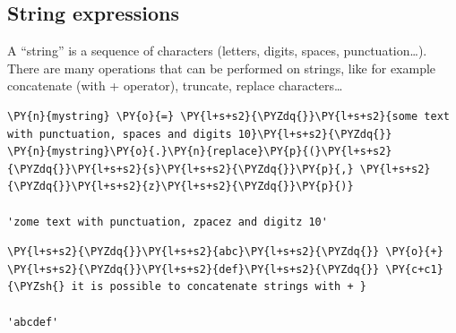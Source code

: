\subsection{String expressions}\label{string-expressions}

A ``string'' is a sequence of characters (letters, digits, spaces, punctuation\ldots{}). There are many operations that can be performed on strings, like for example concatenate (with + operator), truncate, replace characters\ldots{}

\begin{tcolorbox}[breakable, size=fbox, boxrule=1pt, pad at break*=1mm, colback=cellbackground, colframe=cellborder]            
\begin{Verbatim}[commandchars=\\\{\}]
\PY{n}{mystring} \PY{o}{=} \PY{l+s+s2}{\PYZdq{}}\PY{l+s+s2}{some text with punctuation, spaces and digits 10}\PY{l+s+s2}{\PYZdq{}}
\PY{n}{mystring}\PY{o}{.}\PY{n}{replace}\PY{p}{(}\PY{l+s+s2}{\PYZdq{}}\PY{l+s+s2}{s}\PY{l+s+s2}{\PYZdq{}}\PY{p}{,} \PY{l+s+s2}{\PYZdq{}}\PY{l+s+s2}{z}\PY{l+s+s2}{\PYZdq{}}\PY{p}{)}

'zome text with punctuation, zpacez and digitz 10'
\end{Verbatim}
\end{tcolorbox}

\begin{tcolorbox}[breakable, size=fbox, boxrule=1pt, pad at break*=1mm, colback=cellbackground, colframe=cellborder]            
\begin{Verbatim}[commandchars=\\\{\}]
\PY{l+s+s2}{\PYZdq{}}\PY{l+s+s2}{abc}\PY{l+s+s2}{\PYZdq{}} \PY{o}{+} \PY{l+s+s2}{\PYZdq{}}\PY{l+s+s2}{def}\PY{l+s+s2}{\PYZdq{}} \PY{c+c1}{\PYZsh{} it is possible to concatenate strings with + }

'abcdef'
\end{Verbatim}
\end{tcolorbox}

